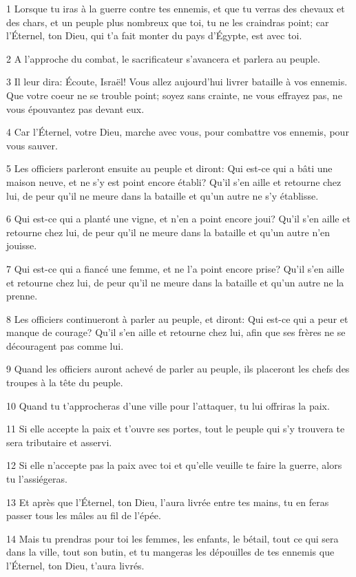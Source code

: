 \par 1 Lorsque tu iras à la guerre contre tes ennemis, et que tu verras des chevaux et des chars, et un peuple plus nombreux que toi, tu ne les craindras point; car l'Éternel, ton Dieu, qui t'a fait monter du pays d'Égypte, est avec toi.
\par 2 A l'approche du combat, le sacrificateur s'avancera et parlera au peuple.
\par 3 Il leur dira: Écoute, Israël! Vous allez aujourd'hui livrer bataille à vos ennemis. Que votre coeur ne se trouble point; soyez sans crainte, ne vous effrayez pas, ne vous épouvantez pas devant eux.
\par 4 Car l'Éternel, votre Dieu, marche avec vous, pour combattre vos ennemis, pour vous sauver.
\par 5 Les officiers parleront ensuite au peuple et diront: Qui est-ce qui a bâti une maison neuve, et ne s'y est point encore établi? Qu'il s'en aille et retourne chez lui, de peur qu'il ne meure dans la bataille et qu'un autre ne s'y établisse.
\par 6 Qui est-ce qui a planté une vigne, et n'en a point encore joui? Qu'il s'en aille et retourne chez lui, de peur qu'il ne meure dans la bataille et qu'un autre n'en jouisse.
\par 7 Qui est-ce qui a fiancé une femme, et ne l'a point encore prise? Qu'il s'en aille et retourne chez lui, de peur qu'il ne meure dans la bataille et qu'un autre ne la prenne.
\par 8 Les officiers continueront à parler au peuple, et diront: Qui est-ce qui a peur et manque de courage? Qu'il s'en aille et retourne chez lui, afin que ses frères ne se découragent pas comme lui.
\par 9 Quand les officiers auront achevé de parler au peuple, ils placeront les chefs des troupes à la tête du peuple.
\par 10 Quand tu t'approcheras d'une ville pour l'attaquer, tu lui offriras la paix.
\par 11 Si elle accepte la paix et t'ouvre ses portes, tout le peuple qui s'y trouvera te sera tributaire et asservi.
\par 12 Si elle n'accepte pas la paix avec toi et qu'elle veuille te faire la guerre, alors tu l'assiégeras.
\par 13 Et après que l'Éternel, ton Dieu, l'aura livrée entre tes mains, tu en feras passer tous les mâles au fil de l'épée.
\par 14 Mais tu prendras pour toi les femmes, les enfants, le bétail, tout ce qui sera dans la ville, tout son butin, et tu mangeras les dépouilles de tes ennemis que l'Éternel, ton Dieu, t'aura livrés.
